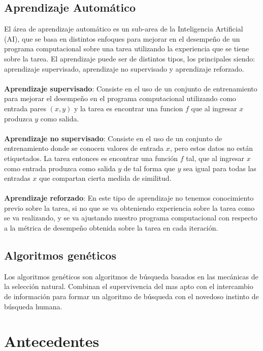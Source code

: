 \subsection{Aprendizaje Automático}

El área de aprendizaje automático es un sub-area de la Inteligencia Artificial (AI), que se basa en distintos enfoques para mejorar en el desempeño de un programa computacional sobre una tarea utilizando la experiencia que se tiene sobre la tarea. El aprendizaje puede ser de distintos tipos, los principales siendo: aprendizaje supervisado, aprendizaje no supervisado y aprendizaje reforzado.
\\
\\
\textbf{Aprendizaje supervisado}: Consiste en el uso de un conjunto de entrenamiento para mejorar el desempeño en el programa computacional utilizando como entrada pares $(x,y)$ y la tarea es encontrar una funcion $f$ que al ingresar $x$ produzca $y$ como salida. 
\\
\\
\textbf{Aprendizaje no supervisado}: Consiste en el uso de un conjunto de entrenamiento donde se conocen valores de entrada $x$, pero estos datos no están etiquetados. La tarea entonces es encontrar una función $f$ tal, que al ingresar $x$ como entrada produzca como salida $y$ de tal forma que $y$ sea igual para todas las entradas $x$ que compartan cierta medida de similitud.
\\
\\
\textbf{Aprendizaje reforzado}: En este tipo de aprendizaje no tenemos conocimiento previo sobre la tarea, si no que se va obteniendo experiencia sobre la tarea como se va realizando, y se va ajustando nuestro programa computacional con respecto a la métrica de desempeño obtenida sobre la tarea en cada iteración.

\subsection{Algoritmos genéticos}

Los algoritmos genéticos son algoritmos de búsqueda basados en las mecánicas de la selección natural. Combinan el supervivencia del mas apto con el intercambio de información para formar un algoritmo de búsqueda con el novedoso instinto de búsqueda humana.  


\section{Antecedentes}


